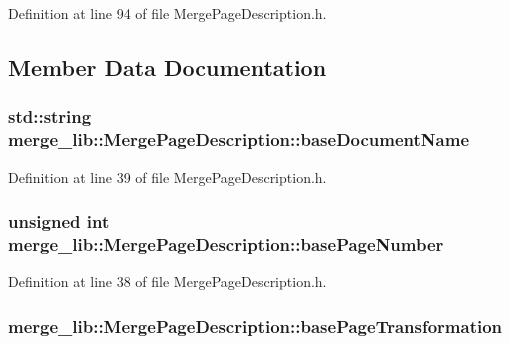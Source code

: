 Definition at line 94 of file Merge\-Page\-Description.\-h.



\subsection{Member Data Documentation}
\hypertarget{structmerge__lib_1_1_merge_page_description_a82756e306c69e3ed7bbb18ab07602f1b}{
\subsubsection[{base\-Document\-Name}]{\setlength{\rightskip}{0pt plus 5cm}std\-::string merge\-\_\-lib\-::\-Merge\-Page\-Description\-::base\-Document\-Name}}\label{d0/dff/structmerge__lib_1_1_merge_page_description_a82756e306c69e3ed7bbb18ab07602f1b}


Definition at line 39 of file Merge\-Page\-Description.\-h.

\hypertarget{structmerge__lib_1_1_merge_page_description_a94f4ed60f98dd2d9c394f7a15915a410}{
\subsubsection[{base\-Page\-Number}]{\setlength{\rightskip}{0pt plus 5cm}unsigned int merge\-\_\-lib\-::\-Merge\-Page\-Description\-::base\-Page\-Number}}\label{d0/dff/structmerge__lib_1_1_merge_page_description_a94f4ed60f98dd2d9c394f7a15915a410}


Definition at line 38 of file Merge\-Page\-Description.\-h.

\hypertarget{structmerge__lib_1_1_merge_page_description_a843e801e2eb4c707bf54ad24e9ab1a15}{
\subsubsection[{base\-Page\-Transformation}]{ merge\-\_\-lib\-::\-Merge\-Page\-Description\-::base\-Page\-Transformation}}\label{d0/dff/structmerge__lib_1_1_merge_page_description_a843e801e2eb4c707bf54ad24e9ab1a15}


